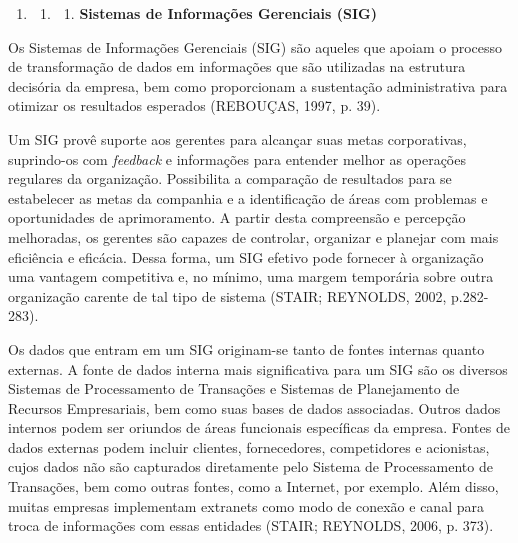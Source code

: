 \documentclass[a4paper]{article}
\newcounter{saveenum}
\newcommand\liststyleWWviiiNumi{%
\renewcommand\theenumi{\arabic{enumi}}
\renewcommand\theenumii{\arabic{enumi}.\arabic{enumii}}
\renewcommand\theenumiii{\arabic{enumi}.\arabic{enumii}.\arabic{enumiii}}
\renewcommand\theenumiv{\arabic{enumi}.\arabic{enumii}.\arabic{enumiii}.\arabic{enumiv}}
\renewcommand\labelenumi{\theenumi}
\renewcommand\labelenumii{\theenumii}
\renewcommand\labelenumiii{\theenumiii}
\renewcommand\labelenumiv{\theenumiv.}
}
\begin{document}
\bigskip


\bigskip

\liststyleWWviiiNumi
\setcounter{saveenum}{\value{enumi}}
\begin{enumerate}
\setcounter{enumi}{\value{saveenum}}
\item \setcounter{saveenum}{\value{enumii}}
\begin{enumerate}
\setcounter{enumii}{\value{saveenum}}
\item \setcounter{saveenum}{\value{enumiii}}
\begin{enumerate}
\setcounter{enumiii}{\value{saveenum}}
\item {
\textsf{\textbf{Sistemas de Informa\c{c}\~oes Gerenciais (SIG)}}}
\end{enumerate}
\end{enumerate}
\end{enumerate}
{
\textsf{Os Sistemas de Informa\c{c}\~oes Gerenciais (SIG) s\~ao aqueles que apoiam o processo de transforma\c{c}\~ao de
dados em informa\c{c}\~oes que s\~ao utilizadas na estrutura decis\'oria da empresa, bem como proporcionam a
sustenta\c{c}\~ao administrativa para otimizar os resultados esperados (REBOU\c{C}AS, 1997, p. 39).}}

{
\textsf{Um SIG prov\^e suporte aos gerentes para alcan\c{c}ar suas metas corporativas, suprindo-os com
}\textsf{\textit{feedback}}\textsf{ e informa\c{c}\~oes para entender melhor as opera\c{c}\~oes regulares da
organiza\c{c}\~ao. Possibilita a compara\c{c}\~ao de resultados para se estabelecer as metas da companhia e a
identifica\c{c}\~ao de \'areas com problemas e oportunidades de aprimoramento. A partir desta compreens\~ao e
percep\c{c}\~ao melhoradas, os gerentes s\~ao capazes de controlar, organizar e planejar com mais efici\^encia e
efic\'acia. Dessa forma, um SIG efetivo pode fornecer \`a organiza\c{c}\~ao uma vantagem competitiva e, no m\'inimo,
uma margem tempor\'aria sobre outra organiza\c{c}\~ao carente de tal tipo de sistema (STAIR; REYNOLDS, 2002,
p.282-283).}}

{
\textsf{Os dados que entram em um SIG originam-se tanto de fontes internas quanto externas. A fonte de dados interna
mais significativa para um SIG s\~ao os diversos Sistemas de Processamento de Transa\c{c}\~oes e Sistemas de
Planejamento de Recursos Empresariais, bem como suas bases de dados associadas. Outros dados internos podem ser
oriundos de \'areas funcionais espec\'ificas da empresa. Fontes de dados externas podem incluir clientes, fornecedores,
competidores e acionistas, cujos dados n\~ao s\~ao capturados diretamente pelo Sistema de Processamento de
Transa\c{c}\~oes, bem como outras fontes, como a Internet, por exemplo. Al\'em disso, muitas empresas implementam
extranets como modo de conex\~ao e canal para troca de informa\c{c}\~oes com essas entidades (STAIR; REYNOLDS, 2006, p.
373).}}
\end{document}
